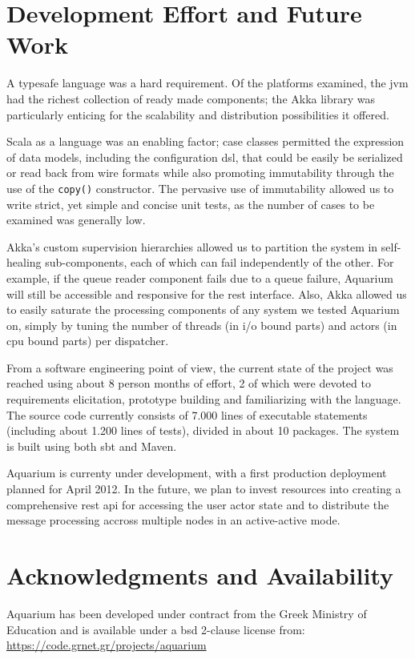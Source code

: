 \documentclass[letterpaper,twocolumn,10pt]{article}
\begin{document}

\section{Development Effort and Future Work}

A typesafe language was a hard requirement. Of the platforms examined,
the {\sc jvm} had the richest collection of ready made components; the
Akka library was particularly enticing for the scalability and
distribution possibilities it offered.

Scala as a language was an enabling factor; case classes permitted the
expression of data models, including the configuration {\sc dsl}, that
could be easily be serialized or read back from wire formats while
also promoting immutability through the use of the \texttt{copy()}
constructor. The pervasive use of immutability allowed us to write
strict, yet simple and concise unit tests, as the number of cases to
be examined was generally low. 

Akka's custom supervision hierarchies allowed us to partition the
system in self-healing sub-components, each of which can fail
independently of the other. For example, if the queue reader component
fails due to a queue failure, Aquarium will still be accessible and
responsive for the {\sc rest} interface. Also, Akka allowed us to
easily saturate the processing components of any system we tested
Aquarium on, simply by tuning the number of threads (in {\sc i/o}
bound parts) and actors (in {\sc cpu} bound parts) per dispatcher.

From a software engineering point of view, the current state of the project was
reached using about 8 person months of effort, 2 of which were devoted to
requirements elicitation, prototype building and familiarizing with the
language. The source code currently consists of 7.000 lines of executable
statements (including about 1.200 lines of tests), divided in about 10
packages. The system is built using both {\sc sbt} and Maven.

Aquarium is currenty under development, with a first production deployment
planned for April 2012. In the future, we plan to invest resources into
creating a comprehensive {\sc rest api} for accessing the user actor state and
to distribute the message processing accross multiple nodes in an active-active
mode.

\section{Acknowledgments and Availability}

Aquarium has been developed under contract from the Greek Ministry of Education and is available under a {\sc bsd} 2-clause license from:
\url{https://code.grnet.gr/projects/aquarium}

{\footnotesize 
}
\end{document}
